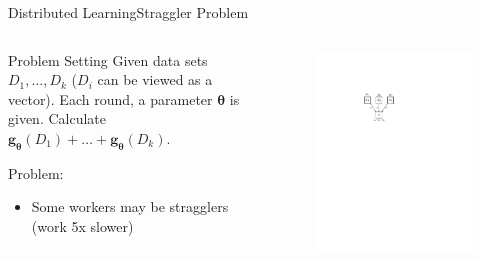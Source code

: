 \documentclass{beamer}
\begin{document}
\begin{frame}{Distributed Learning}{Straggler Problem}
    \begin{columns}
        \begin{column}{0.6\textwidth}
            \begin{block}{Problem Setting}
                Given data sets $D_1, \dots, D_k$ ($D_i$ can be viewed as a vector). Each round, a parameter $\boldsymbol{\theta}$ is given. Calculate $\boldsymbol{g}_{\boldsymbol{\theta}}(D_1) + \dots + \boldsymbol{g}_{\boldsymbol{\theta}}(D_k)$.
            \end{block}
            Problem:
            \begin{itemize}
                \item Some workers may be stragglers (work 5x slower)
            \end{itemize}
            
        \end{column}
        \begin{column}{0.48\textwidth}
            \begin{figure}
                \centering
                \includegraphics[height=.5\textheight]{res/distributed_learning.pdf}
            \end{figure}
        \end{column}
    \end{columns}
\end{frame}
\end{document}
